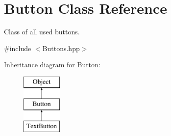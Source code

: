 \hypertarget{class_button}{}\section{Button Class Reference}
\label{class_button}


Class of all used buttons.  




{\ttfamily \#include $<$Buttons.\+hpp$>$}

Inheritance diagram for Button\+:\begin{figure}[H]
\begin{center}
\leavevmode
\includegraphics[height=3.000000cm]{class_button}
\end{center}
\end{figure}
